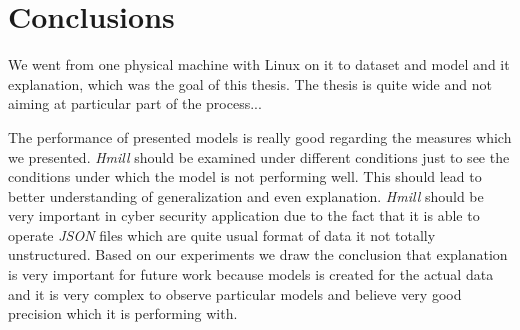 \chapter{Conclusions} \label{chap:concl}
 We went from one physical machine with Linux on it to dataset and model and it explanation, which was the goal of this thesis. The thesis is quite wide and not aiming at particular part of the process...



The performance of presented models is really good regarding the measures which we presented. \emph{Hmill} should be examined under different conditions just to see the conditions under which the model is not performing well. This should lead to better understanding of generalization and even explanation. \emph{Hmill} should be very important in cyber security application due to the fact that it is able to operate \emph{JSON} files which are quite usual format of data it not totally unstructured. Based on our experiments we draw the conclusion that explanation is very important for future work because models is created for the actual data and it is very complex to observe particular models and believe very good precision which it is performing with.